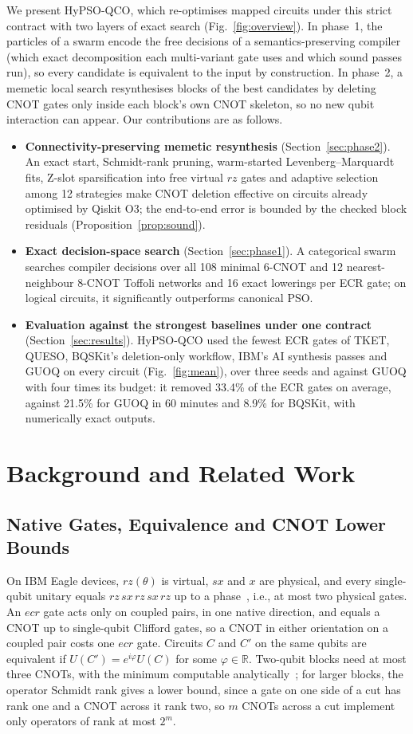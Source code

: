 \documentclass[conference,letterpaper]{IEEEtran}
\newcommand{\hypso}{HyPSO-QCO}
\begin{document}
We present \hypso{}, which re-optimises mapped circuits under this strict contract with two layers of exact
search (Fig.~\ref{fig:overview}). In phase~1, the particles of a swarm encode the free decisions of a
semantics-preserving compiler (which exact decomposition each multi-variant gate uses and which sound passes
run), so every candidate is equivalent to the input by construction. In phase~2, a memetic local search
resynthesises blocks of the best candidates by deleting CNOT gates only inside each block's own CNOT
skeleton, so no new qubit interaction can appear. Our contributions are as follows.
\begin{itemize}
\item \textbf{Connectivity-preserving memetic resynthesis} (Section~\ref{sec:phase2}). An exact start,
Schmidt-rank pruning, warm-started Levenberg--Marquardt fits, Z-slot sparsification into free virtual $rz$
gates and adaptive selection among 12 strategies make CNOT deletion effective on circuits already optimised
by Qiskit O3; the end-to-end error is bounded by the checked block residuals
(Proposition~\ref{prop:sound}).
\item \textbf{Exact decision-space search} (Section~\ref{sec:phase1}). A categorical swarm searches compiler
decisions over all 108 minimal 6-CNOT and 12 nearest-neighbour 8-CNOT Toffoli networks and 16 exact
lowerings per ECR gate; on logical circuits, it significantly outperforms canonical PSO.
\item \textbf{Evaluation against the strongest baselines under one contract} (Section~\ref{sec:results}).
\hypso{} used the fewest ECR gates of TKET, QUESO, BQSKit's deletion-only workflow, IBM's AI synthesis
passes and GUOQ on every circuit (Fig.~\ref{fig:mean}), over three seeds and against GUOQ with four times its
budget: it removed 33.4\% of the ECR gates on average, against 21.5\% for GUOQ in 60 minutes and 8.9\% for
BQSKit, with numerically exact outputs.
\end{itemize}

\section{Background and Related Work}

\subsection{Native Gates, Equivalence and CNOT Lower Bounds}
On IBM Eagle devices, $rz(\theta)$ is virtual, $sx$ and $x$ are physical, and every single-qubit unitary
equals $rz\,sx\,rz\,sx\,rz$ up to a phase~\cite{nielsen}, i.e., at most two physical gates. An $ecr$ gate
acts only on coupled pairs, in one native direction, and equals a CNOT up to single-qubit Clifford gates, so
a CNOT in either orientation on a coupled pair costs one $ecr$ gate. Circuits $C$ and $C'$ on the same
qubits are equivalent if $U(C') = e^{i\varphi}U(C)$ for some $\varphi\in\mathbb{R}$. Two-qubit blocks need
at most three CNOTs, with the minimum computable analytically~\cite{shende2004}; for larger blocks, the
operator Schmidt rank gives a lower bound, since a gate on one side of a cut has rank one and a CNOT across
it rank two, so $m$ CNOTs across a cut implement only operators of rank at most $2^m$.
\end{document}
